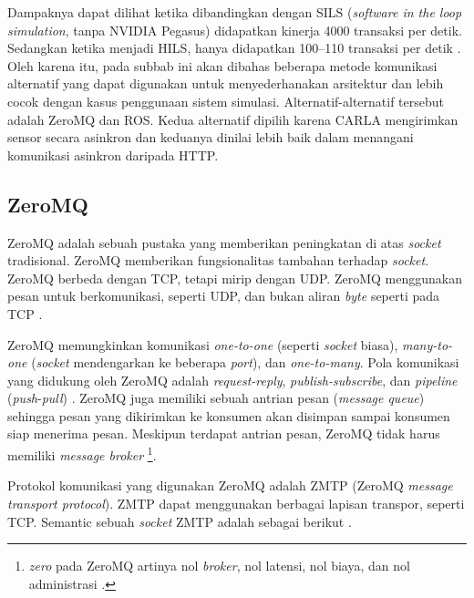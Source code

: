 Dampaknya dapat dilihat ketika dibandingkan dengan SILS (\textit{software
	in the loop simulation}, tanpa NVIDIA Pegasus) didapatkan kinerja 4000 transaksi
per detik. Sedangkan ketika menjadi HILS, hanya didapatkan 100--110 transaksi per
detik \parencite{trilaksono_laporanRispro}. Oleh karena itu, pada subbab ini
akan dibahas beberapa metode komunikasi alternatif yang dapat digunakan untuk
menyederhanakan arsitektur dan lebih cocok dengan kasus penggunaan sistem
simulasi. Alternatif-alternatif tersebut adalah ZeroMQ dan ROS. Kedua alternatif
dipilih karena CARLA mengirimkan sensor secara asinkron dan keduanya dinilai
lebih baik dalam menangani komunikasi asinkron daripada HTTP.

\subsection{ZeroMQ}\label{chapter-2-section-zeromq}

ZeroMQ adalah sebuah pustaka yang memberikan peningkatan di atas
\textit{socket} tradisional. ZeroMQ memberikan fungsionalitas tambahan terhadap
\textit{socket}. ZeroMQ berbeda dengan TCP, tetapi mirip dengan UDP. ZeroMQ
menggunakan pesan untuk berkomunikasi, seperti UDP, dan bukan aliran
\textit{byte} seperti pada TCP \parencite{zmq_chapter2}.

ZeroMQ memungkinkan komunikasi \textit{one-to-one} (seperti \textit{socket}
biasa), \textit{many-to-one} (\textit{socket} mendengarkan ke beberapa
\textit{port}), dan \textit{one-to-many}. Pola komunikasi yang didukung oleh
ZeroMQ adalah \textit{request-reply}, \textit{publish-subscribe}, dan
\textit{pipeline} (\textit{push}-\textit{pull}) \parencite{zmq_chapter2}. ZeroMQ
juga memiliki sebuah antrian pesan (\textit{message queue}) sehingga pesan yang
dikirimkan ke konsumen akan disimpan sampai konsumen siap menerima pesan.
Meskipun terdapat antrian pesan, ZeroMQ tidak harus memiliki \textit{message
	broker} \parencite{zmq_getStartedDocs}\footnote{\textit{zero} pada ZeroMQ
	artinya nol \textit{broker}, nol latensi, nol biaya, dan nol administrasi
	\parencite{zmq_getStartedDocs}.}.

Protokol komunikasi yang digunakan ZeroMQ adalah ZMTP (ZeroMQ \textit{message
	transport protocol}). ZMTP dapat menggunakan berbagai lapisan transpor,
seperti TCP. Semantic sebuah \textit{socket} ZMTP adalah sebagai
berikut \parencite{hurton_zmtp}.

